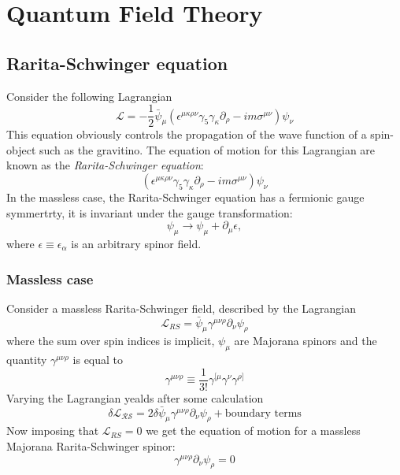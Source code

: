 \chapter{Quantum Field Theory}

\section{Rarita-Schwinger equation}
Consider the following Lagrangian
\begin{equation}
  \mathcal{L} = -\frac{1}{2}\bar{\psi}_\mu\left(\epsilon^{\mu\kappa\rho\nu}\gamma_5\gamma_\kappa\partial_\rho-im\sigma^{\mu\nu}\right)\psi_\nu
\end{equation}
This equation obviously controls the propagation of the wave function of
a spin- object such as the gravitino. The equation of motion for
this Lagrangian are known as the \textit{Rarita-Schwinger equation}:
\begin{equation}
\left(\epsilon^{\mu\kappa\rho\nu}\gamma_5\gamma_\kappa\partial_\rho
  -im\sigma^{\mu\nu}\right)\psi_\nu
\end{equation}
In the massless case, the Rarita-Schwinger equation has a fermionic gauge
symmertrty, it is invariant under the gauge transformation:
\begin{equation}
  \psi_\mu\rightarrow\psi_\mu + \partial_\mu\epsilon,
\end{equation}
where $\epsilon\equiv\epsilon_\alpha$ is an arbitrary spinor field. 
\subsection{Massless case}
Consider a massless Rarita-Schwinger field, described by the Lagrangian
\begin{equation}
  \mathcal{L}_{RS} = \bar{\psi}_\mu\gamma^{\mu\nu\rho}\partial_\nu\psi_{\rho}
\end{equation}
where the sum over spin indices is implicit, $\psi_\mu$ are Majorana spinors
and the quantity $\gamma^{\mu\nu\rho}$ is equal to
\begin{equation}
  \gamma^{\mu\nu\rho}\equiv\frac{1}{3!}\gamma^{[\mu}\gamma^\nu\gamma^{\rho]}
\end{equation}
Varying the Lagrangian yealds after some calculation
\begin{equation}
  \delta\mathcal{L_{RS}}
  = 2\delta\bar{\psi}_\mu\gamma^{\mu\nu\rho}\partial_\nu\psi_\rho
  + \text{boundary terms}
\end{equation}
Now imposing that $\mathcal{L}_{RS} =0$ we get the equation of motion for
a massless Majorana Rarita-Schwinger spinor:
\begin{equation}
  \gamma^{\mu\nu\rho}\partial_\nu\psi_\rho = 0
\end{equation}
